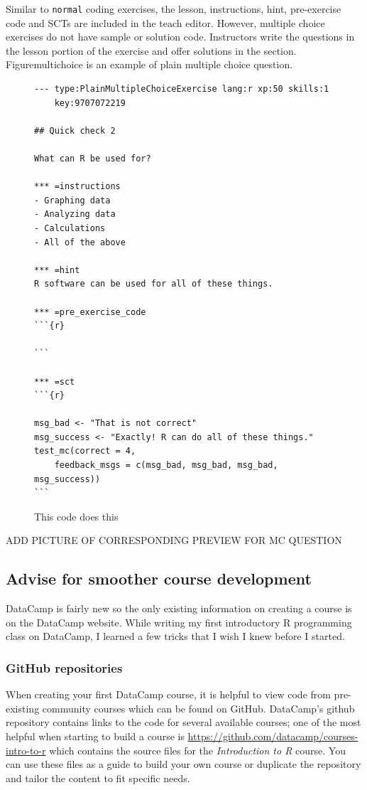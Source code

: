 \documentclass[12pt]{article}\usepackage[]{graphicx}\usepackage[]{color}
\begin{document}
Similar to \texttt{normal} coding exercises, the lesson, instructions, hint, pre-exercise 
code and SCTs are included in the teach editor. However, multiple choice exercises do not have sample or solution code. 
Instructors write the questions in the lesson
portion of the exercise and offer solutions in the  section. Figuremultichoice is an example of plain multiple choice question.
\begin{figure}
\caption{This code does this}
\begin{Verbatim}[frame=single]
--- type:PlainMultipleChoiceExercise lang:r xp:50 skills:1
    key:9707072219

## Quick check 2

What can R be used for?

*** =instructions
- Graphing data
- Analyzing data
- Calculations
- All of the above

*** =hint
R software can be used for all of these things.

*** =pre_exercise_code
```{r}

```

*** =sct
```{r}

msg_bad <- "That is not correct"
msg_success <- "Exactly! R can do all of these things."
test_mc(correct = 4, 
    feedback_msgs = c(msg_bad, msg_bad, msg_bad, msg_success))
```
\end{Verbatim}
\end{figure}

ADD PICTURE OF CORRESPONDING PREVIEW FOR MC QUESTION

\subsection{Advise for smoother course development}
DataCamp is fairly new so the only existing information on creating a course is on the DataCamp website. While writing my first introductory R programming class on DataCamp, I learned a few tricks that I wish I knew before I started. 
\subsubsection{GitHub repositories}
When creating your first DataCamp course, it is helpful to view code from pre-existing community courses which can be found on GitHub.
DataCamp's github repository contains links to the code for several available courses; one of the most helpful when starting to build a course 
is \url{https://github.com/datacamp/courses-intro-to-r} which contains the source files for the \textit{Introduction to R} course.
You can use these files as a guide to build your own course or duplicate the repository and tailor the content to fit specific needs.
\end{document}
